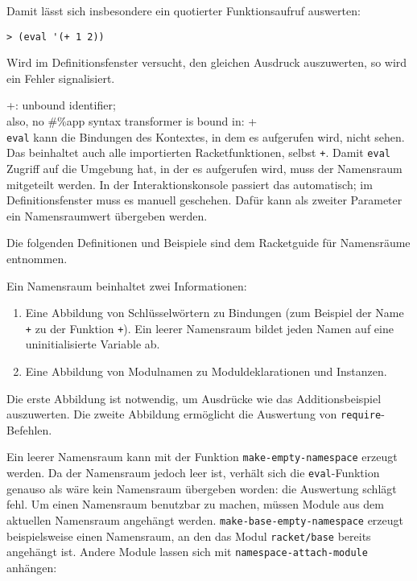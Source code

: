 Damit lässt sich insbesondere ein quotierter Funktionsaufruf auswerten:

\begin{lstlisting}
> (eval '(+ 1 2))
\end{lstlisting}
{}

Wird im Definitionsfenster versucht, den gleichen Ausdruck auszuwerten, so wird ein Fehler signalisiert.

{\color{red}\ttfamily\small\hspace{5pt} +: unbound identifier;}\\
{\color{red}\ttfamily\small\hspace{5pt} also, no \#\%app syntax transformer is bound in: +}\\

\texttt{eval} kann die Bindungen des Kontextes, in dem es aufgerufen wird, nicht sehen. Das beinhaltet auch alle importierten Racketfunktionen, selbst \texttt{+}. Damit \texttt{eval} Zugriff auf die Umgebung hat, in der es aufgerufen wird, muss der Namensraum mitgeteilt werden. In der Interaktionskonsole passiert das automatisch; im Definitionsfenster muss es manuell geschehen. Dafür kann als zweiter Parameter ein Namensraumwert übergeben werden. 

Die folgenden Definitionen und Beispiele sind dem Racketguide für Namensräume \cite{racketguide-namespace} entnommen.

Ein Namensraum beinhaltet zwei Informationen:
\begin{enumerate}
 \item Eine Abbildung von Schlüsselwörtern zu Bindungen (zum Beispiel der Name \texttt{+} zu der Funktion \texttt{+}). Ein leerer Namensraum bildet jeden Namen auf eine uninitialisierte Variable ab.
 \item Eine Abbildung von Modulnamen zu Moduldeklarationen und Instanzen.
\end{enumerate}

Die erste Abbildung ist notwendig, um Ausdrücke wie das Additionsbeispiel auszuwerten. Die zweite Abbildung ermöglicht die Auswertung von \texttt{require}-Befehlen.

Ein leerer Namensraum kann mit der Funktion \texttt{make-empty-namespace} erzeugt werden. Da der Namensraum jedoch leer ist, verhält sich die \texttt{eval}-Funktion genauso als wäre kein Namensraum übergeben worden: die Auswertung schlägt fehl. Um einen Namensraum benutzbar zu machen, müssen Module aus dem aktuellen Namensraum angehängt werden. \texttt{make-base-empty-namespace} erzeugt beispielsweise einen Namensraum, an den das Modul \texttt{racket/base} bereits angehängt ist. Andere Module lassen sich mit \texttt{namespace-attach-module} anhängen:

